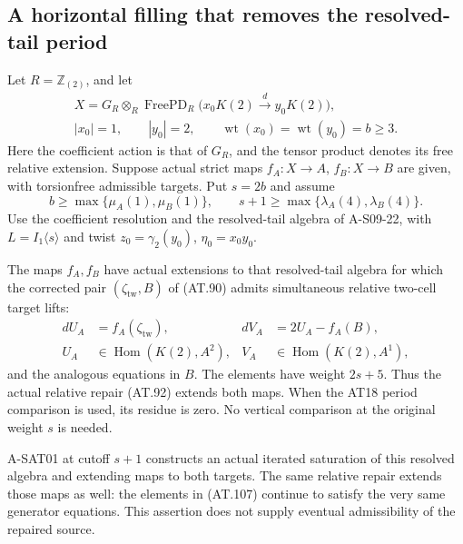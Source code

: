 \subsection{A horizontal filling that removes the resolved-tail period}

\begin{proposition}
\label{AT19}
Let $R=\mathbb Z_{(2)}$, and let
\[
\begin{gathered}
 X=G_R\otimes_R\operatorname{FreePD}_R
          \bigl(x_0K(2)\xrightarrow{\,d\,}y_0K(2)\bigr),\\
 |x_0|=1,\qquad |y_0|=2,\qquad
 \operatorname{wt}(x_0)=\operatorname{wt}(y_0)=b\geq3.
\end{gathered}
 \tag{AT.105}
\]
Here the coefficient action is that of $G_R$, and the tensor
product denotes its free relative extension.
Suppose actual strict maps $f_A:X\to A$, $f_B:X\to B$ are
given, with torsionfree admissible targets. Put $s=2b$ and
assume
\[
 b\geq\max\{\mu_A(1),\mu_B(1)\},\qquad
 s+1\geq\max\{\lambda_A(4),\lambda_B(4)\}.
 \tag{AT.106}
\]
Use the coefficient resolution and the resolved-tail algebra
of A-S09-22, with $L=I_1\langle s\rangle$ and twist
$z_0=\gamma_2(y_0)$, $\eta_0=x_0y_0$.

The maps $f_A,f_B$ have actual extensions to that resolved-tail
algebra for which the corrected pair
$(\zeta_{\mathrm{tw}},B)$ of (AT.90) admits simultaneous
relative two-cell target lifts:
\[
 \begin{aligned}
 dU_A&=f_A(\zeta_{\mathrm{tw}}),&
 dV_A&=2U_A-f_A(B),\\
 U_A&\in\operatorname{Hom}(K(2),A^2),&
 V_A&\in\operatorname{Hom}(K(2),A^1),
 \end{aligned}
 \tag{AT.107}
\]
and the analogous equations in $B$.
The elements have weight $2s+5$.
Thus the actual relative repair (AT.92) extends both maps.
When the AT18 period comparison is used, its residue is zero.
No vertical comparison at the original weight $s$ is needed.

A-SAT01 at cutoff $s+1$ constructs an actual iterated
saturation of this resolved algebra and extending maps
to both targets. The same relative repair extends those
maps as well: the elements in (AT.107) continue to satisfy
the very same generator equations.
This assertion does not supply eventual admissibility of
the repaired source.
\end{proposition}

